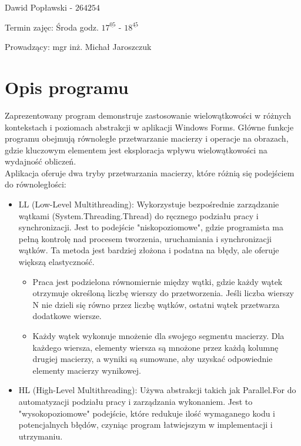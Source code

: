 \documentclass{report}
\begin{document}
\begin{titlepage}
\begin{center}
{			}
		\end{center}
		
		\vspace*{2cm}
		
		\begin{flushright}
			{
				Dawid Popławski - $264254$
				
				Termin zajęc: Środa godz. $17^{\underline{05}}$ - $18^{\underline{45}}$ 
				
				Prowadzący: mgr inż. Michał Jaroszczuk
				
			}
			
		\end{flushright}
		
		\vfill
		
\end{titlepage}

\tableofcontents

\chapter{Opis programu}

Zaprezentowany program demonstruje zastosowanie wielowątkowości w różnych kontekstach i poziomach abstrakcji w aplikacji Windows Forms. Główne funkcje programu obejmują równoległe przetwarzanie macierzy i operacje na obrazach, gdzie kluczowym elementem jest eksploracja wpływu wielowątkowości na wydajność obliczeń. \\

Aplikacja oferuje dwa tryby przetwarzania macierzy, które różnią się podejściem do równoległości:

\begin{itemize}
	\item LL (Low-Level Multithreading): Wykorzystuje bezpośrednie zarządzanie wątkami (System.Threading.Thread) do ręcznego podziału pracy i synchronizacji. Jest to podejście "niskopoziomowe", gdzie programista ma pełną kontrolę nad procesem tworzenia, uruchamiania i synchronizacji wątków. Ta metoda jest bardziej złożona i podatna na błędy, ale oferuje większą elastyczność.
	\begin{itemize}
		\item Praca jest podzielona równomiernie między wątki, gdzie każdy wątek otrzymuje określoną liczbę wierszy do przetworzenia. Jeśli liczba wierszy N nie dzieli się równo przez liczbę wątków, ostatni wątek przetwarza dodatkowe wiersze.
		\item Każdy wątek wykonuje mnożenie dla swojego segmentu macierzy. Dla każdego wiersza, elementy wiersza są mnożone przez każdą kolumnę drugiej macierzy, a wyniki są sumowane, aby uzyskać odpowiednie elementy macierzy wynikowej.
	\end{itemize}
	\item HL (High-Level Multithreading): Używa abstrakcji takich jak Parallel.For do automatyzacji podziału pracy i zarządzania wykonaniem. Jest to "wysokopoziomowe" podejście, które redukuje ilość wymaganego kodu i potencjalnych błędów, czyniąc program łatwiejszym w implementacji i utrzymaniu.

\end{itemize}
\end{document}
